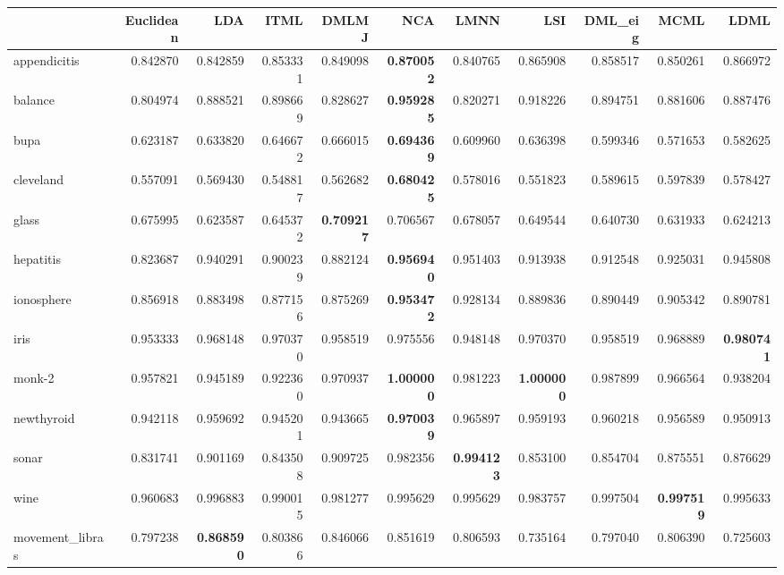 \begin{tabular}{lrrrrrrrrrr}
\toprule
{} &  Euclidean &       LDA &      ITML &     DMLMJ &       NCA &      LMNN &       LSI &   DML\_eig &      MCML &      LDML \\
\midrule
appendicitis    &   0.842870 &  0.842859 &  0.853331 &  0.849098 &  \textbf{0.870052} &  0.840765 &  0.865908 &  0.858517 &  0.850261 &  0.866972 \\
balance         &   0.804974 &  0.888521 &  0.898669 &  0.828627 &  \textbf{0.959285} &  0.820271 &  0.918226 &  0.894751 &  0.881606 &  0.887476 \\
bupa            &   0.623187 &  0.633820 &  0.646672 &  0.666015 &  \textbf{0.694369} &  0.609960 &  0.636398 &  0.599346 &  0.571653 &  0.582625 \\
cleveland       &   0.557091 &  0.569430 &  0.548817 &  0.562682 &  \textbf{0.680425} &  0.578016 &  0.551823 &  0.589615 &  0.597839 &  0.578427 \\
glass           &   0.675995 &  0.623587 &  0.645372 &  \textbf{0.709217} &  0.706567 &  0.678057 &  0.649544 &  0.640730 &  0.631933 &  0.624213 \\
hepatitis       &   0.823687 &  0.940291 &  0.900239 &  0.882124 &  \textbf{0.956940} &  0.951403 &  0.913938 &  0.912548 &  0.925031 &  0.945808 \\
ionosphere      &   0.856918 &  0.883498 &  0.877156 &  0.875269 &  \textbf{0.953472} &  0.928134 &  0.889836 &  0.890449 &  0.905342 &  0.890781 \\
iris            &   0.953333 &  0.968148 &  0.970370 &  0.958519 &  0.975556 &  0.948148 &  0.970370 &  0.958519 &  0.968889 &  \textbf{0.980741} \\
monk-2          &   0.957821 &  0.945189 &  0.922360 &  0.970937 &  \textbf{1.000000} &  0.981223 &  \textbf{1.000000} &  0.987899 &  0.966564 &  0.938204 \\
newthyroid      &   0.942118 &  0.959692 &  0.945201 &  0.943665 &  \textbf{0.970039} &  0.965897 &  0.959193 &  0.960218 &  0.956589 &  0.950913 \\
sonar           &   0.831741 &  0.901169 &  0.843508 &  0.909725 &  0.982356 &  \textbf{0.994123} &  0.853100 &  0.854704 &  0.875551 &  0.876629 \\
wine            &   0.960683 &  0.996883 &  0.990015 &  0.981277 &  0.995629 &  0.995629 &  0.983757 &  0.997504 &  \textbf{0.997519} &  0.995633 \\
movement\_libras &   0.797238 &  \textbf{0.868590} &  0.803866 &  0.846066 &  0.851619 &  0.806593 &  0.735164 &  0.797040 &  0.806390 &  0.725603 \\

\end{tabular}
